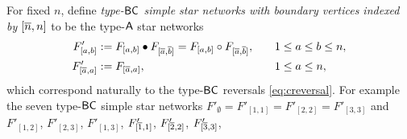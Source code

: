 \documentclass[11pt]{article}
\theoremstyle{definition}
\numberwithin{equation}{section}
\begin{document}
For fixed $n$, define {\em type-$\mathsf{BC}$ simple star networks
  with boundary vertices indexed by $[\overline{n}, n]$} to be the
type-$\mathsf{A}$ star networks
\begin{equation}\label{eq:bcstardef}
  \begin{alignedat}{2}
    F'_{[a,b]} &\defeq F_{[a,b]} \bullet F_{[\ol a, \ol b]}
    = F_{[a,b]} \circ F_{[\ol a, \ol b]},
    &\qquad &1 \leq a \leq b \leq n, \\ 
    F'_{[\ol a, a]} &\defeq F_{[\ol a, a]},
    &\qquad &1 \leq a \leq n,
    \end{alignedat}
\end{equation}
which correspond naturally to the type-$\mathsf{BC}$ reversals \eqref{eq:creversal}.
For example the seven type-$\mathsf{BC}$
simple star networks
$F'_{\emptyset} = F'_{[1,1]} = F'_{[2,2]} = F'_{[3,3]}$ and $F'_{[1,2]}$,
$F'_{[2,3]}$, $F'_{[1,3]}$, $F'_{\smash{[\overline{1}, 1]}}$, $F'_{\smash{[\overline{2}, 2]}}$,
$F'_{\smash{[\overline{3}, 3]}}$,
\end{document}
